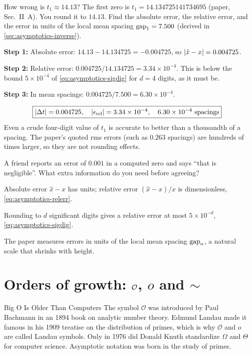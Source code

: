 \begin{sample}{How wrong is $t_1\approx 14.13$?}
The first zero is $t_1=14.134725141734695$ (paper, Sec.~II~A). You round it to $14.13$. Find the absolute error, the relative error, and the error in units of the local mean spacing $\mathrm{gap}_1=7.500$ (derived in \cref{sec:asymptotics-inverse}).

\textbf{Step 1:} Absolute error: $14.13-14.134725=-0.004725$, so $\left\lvert \hat x-x\right\rvert=0.004725$.

\textbf{Step 2:} Relative error: $0.004725/14.134725=3.34\times10^{-4}$. This is below the bound $5\times10^{-4}$ of \cref{eq:asymptotics-sigdig} for $d=4$ digits, as it must be.

\textbf{Step 3:} In mean spacings: $0.004725/7.500=6.30\times10^{-4}$.

\[
\boxed{\left\lvert \Delta t\right\rvert=0.004725,\quad \left\lvert \epsilon_{\rm rel}\right\rvert=3.34\times10^{-4},\quad 6.30\times10^{-4}\text{ spacings}}
\]
Even a crude four-digit value of $t_1$ is accurate to better than a thousandth of a spacing. The paper's quoted rms errors (such as $0.263$ spacings) are hundreds of times larger, so they are not rounding effects.
\end{sample}

\begin{checkpoint}
A friend reports an error of $0.001$ in a computed zero and says ``that is negligible''. What extra information do you need before agreeing?
\end{checkpoint}

\begin{keyideas}
\item Absolute error $\hat x-x$ has units; relative error $(\hat x-x)/x$ is dimensionless, \cref{eq:asymptotics-relerr}.
\item Rounding to $d$ significant digits gives a relative error at most $5\times10^{-d}$, \cref{eq:asymptotics-sigdig}.
\item The paper measures errors in units of the local mean spacing $\mathrm{gap}_n$, a natural scale that shrinks with height.
\end{keyideas}

\section{Orders of growth: $\mathcal{O}$, $o$ and $\sim$}\label{sec:asymptotics-order}
\begin{didyouknow}{Big O Is Older Than Computers}
The symbol $\mathcal{O}$ was introduced by Paul Bachmann in an 1894 book on analytic number theory. Edmund Landau made it famous in his 1909 treatise on the distribution of primes, which is why $\mathcal{O}$ and $o$ are called Landau symbols. Only in 1976 did Donald Knuth standardize $\Omega$ and $\Theta$ for computer science. Asymptotic notation was born in the study of primes.
\end{didyouknow}


